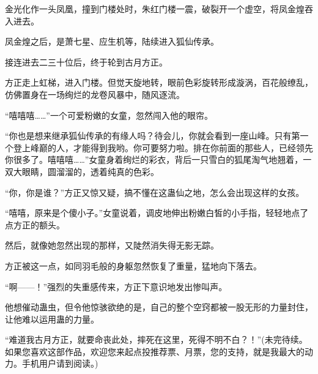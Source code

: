 \begin{this_body}
金光化作一头凤凰，撞到门楼处时，朱红门楼一震，破裂开一个虚空，将凤金煌吞入进去。

凤金煌之后，是萧七星、应生机等，陆续进入狐仙传承。

接连进去二三十位后，终于轮到古月方正。

方正走上虹梯，进入门楼。但觉天旋地转，眼前色彩旋转形成漩涡，百花般缭乱，仿佛置身在一场绚烂的龙卷风暴中，随风逐流。

“嘻嘻嘻……”一个可爱粉嫩的女童，忽然闯入他的眼帘。

“你也是想来继承狐仙传承的有缘人吗？待会儿，你就会看到一座山峰。只有第一个登上峰巅的人，才能得到我哟。你可要努力啦。排在你前面的那些人，已经领先你很多了。嘻嘻嘻……”女童身着绚烂的彩衣，背后一只雪白的狐尾淘气地翘着，一双大眼睛，圆溜溜的，透着纯真的色彩。

“你，你是谁？”方正又惊又疑，搞不懂在这蛊仙之地，怎么会出现这样的女孩。

“嘻嘻，原来是个傻小子。”女童说着，调皮地伸出粉嫩白皙的小手指，轻轻地点了点方正的额头。

然后，就像她忽然出现的那样，又陡然消失得无影无踪。

方正被这一点，如同羽毛般的身躯忽然恢复了重量，猛地向下落去。

“啊——！”强烈的失重感传来，方正下意识地发出惨叫声。

他想催动蛊虫，但令他惊骇欲绝的是，自己的整个空窍都被一股无形的力量封住，让他难以运用蛊的力量。

“难道我古月方正，就要命丧此处，摔死在这里，死得不明不白？！”(未完待续。如果您喜欢这部作品，欢迎您来起点投推荐票、月票，您的支持，就是我最大的动力。手机用户请到阅读。)

\end{this_body}

